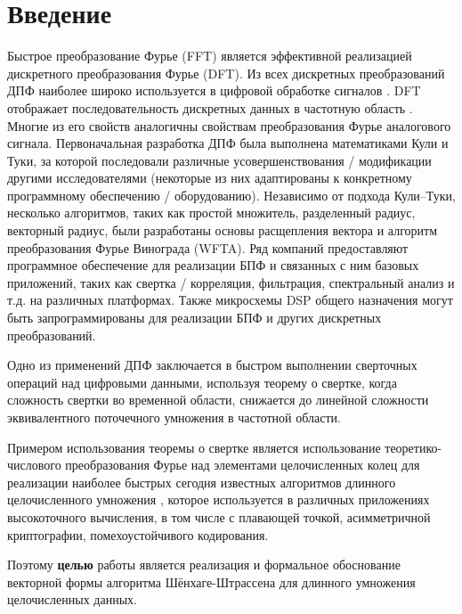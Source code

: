 \chapter*{Введение}
Быстрое преобразование Фурье (FFT) является эффективной реализацией дискретного преобразования Фурье (DFT).
Из всех дискретных преобразований ДПФ наиболее широко используется в цифровой обработке сигналов \cite{ft-spectroscopy-techreport, infrared-spectroscopy-gost, cosmic-materials-gost, cosmic-materials-iso}.
DFT отображает последовательность дискретных данных в частотную область \cite{ComputerAlgorithms}.
Многие из его свойств аналогичны свойствам преобразования Фурье аналогового сигнала.
Первоначальная разработка ДПФ была выполнена математиками Кули и Туки, за которой последовали различные усовершенствования / модификации другими исследователями (некоторые из них адаптированы к конкретному программному обеспечению / оборудованию).
Независимо от подхода Кули–Туки, несколько алгоритмов, таких как простой множитель, разделенный радиус, векторный радиус, были разработаны основы расщепления вектора и алгоритм преобразования Фурье Винограда (WFTA).
Ряд компаний предоставляют программное обеспечение для реализации БПФ и связанных с ним базовых приложений, таких как свертка / корреляция, фильтрация, спектральный анализ и т.д. на различных платформах.
Также микросхемы DSP общего назначения могут быть запрограммированы для реализации БПФ и других дискретных преобразований.

Одно из применений ДПФ заключается в быстром выполнении сверточных операций над цифровыми данными, используя теорему о свертке, когда сложность свертки во временной области, снижается до линейной сложности эквивалентного поточечного умножения в частотной области.

Примером использования теоремы о свертке является использование теоретико-числового преобразования Фурье над элементами целочисленных колец для реализации наиболее быстрых сегодня известных алгоритмов длинного целочисленного умножения \cite{KaratsubaForHomomorphicEncryption}, которое используется в различных приложениях высокоточного вычисления, в том числе с плавающей точкой, асимметричной криптографии, помехоустойчивого кодирования.

Поэтому \textbf{целью} работы является реализация и формальное обоснование векторной формы алгоритма Шёнхаге-Штрассена для длинного умножения целочисленных данных.


